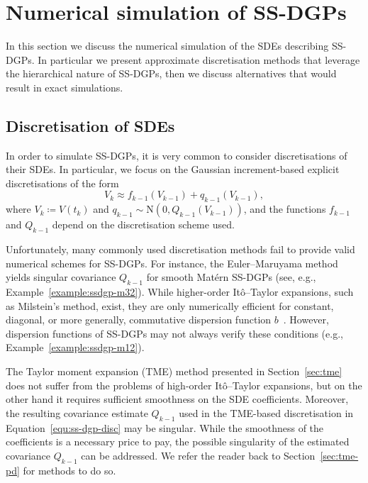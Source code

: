 \section{Numerical simulation of SS-DGPs}
\label{sec:ssdgps-lcd}
In this section we discuss the numerical simulation of the SDEs describing SS-DGPs. In particular we present approximate discretisation methods that leverage the hierarchical nature of SS-DGPs, then we discuss alternatives that would result in exact simulations. 

\subsection*{Discretisation of SDEs}

In order to simulate SS-DGPs, it is very common to consider discretisations of their SDEs. In particular, we focus on the Gaussian increment-based explicit discretisations of the form
%
\begin{equation}
	V_k \approx f_{k-1}(V_{k-1}) + q_{k-1}(V_{k-1}),
	\label{equ:ss-dgp-disc}
\end{equation}
%
where $V_k \coloneqq V(t_k)$ and $q_{k-1} \sim \mathrm{N}(0, Q_{k-1}(V_{k-1}))$, and the functions $f_{k-1}$ and $Q_{k-1}$ depend on the discretisation scheme used.

Unfortunately, many commonly used discretisation methods fail to provide valid numerical schemes for SS-DGPs. For instance, the Euler--Maruyama method yields singular covariance $Q_{k-1}$ for smooth Mat\'{e}rn SS-DGPs (see, e.g., Example~\ref{example:ssdgp-m32}). While higher-order It\^{o}--Taylor expansions, such as Milstein's method, exist, they are only numerically efficient for constant, diagonal, or more generally, commutative dispersion function $b$~\citep[see, the definition of commutative noise in][Chapter 10]{Kloeden1992}. However, dispersion functions of SS-DGPs may not always verify these conditions (e.g., Example~\ref{example:ssdgp-m12}).

The Taylor moment expansion (TME) method presented in Section~\ref{sec:tme} does not suffer from the problems of high-order It\^{o}--Taylor expansions, but on the other hand it requires sufficient smoothness on the SDE coefficients. Moreover, the resulting covariance estimate $Q_{k-1}$ used in the TME-based discretisation in Equation~\eqref{equ:ss-dgp-disc} may be singular. While the smoothness of the coefficients is a necessary price to pay, the possible singularity of the estimated covariance $Q_{k-1}$ can be addressed. We refer the reader back to Section~\ref{sec:tme-pd} for methods to do so.


